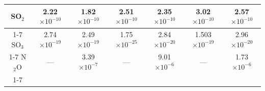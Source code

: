 \begin{table}[h]
\begin{tabular}{c|c|c|c|c|c|c}
SO$_2$ & 2.22$\times10^{-10}$ & 1.82$\times10^{-10}$ & 2.51$\times10^{-10}$ & 2.35$\times10^{-10}$ & 3.02$\times10^{-10}$ & 2.57$\times10^{-10}$ \\ \cline{1-7}
SO$_3$ & 2.74$\times10^{-19}$ & 2.49$\times10^{-19}$ & 1.75$\times10^{-25}$ & 2.84$\times10^{-20}$ & 1.503$\times10^{-19}$ & 2.96$\times10^{-20}$ \\ \cline{1-7}
N$_2$O & --- & 3.39$\times10^{-7}$ & --- & 9.01$\times10^{-6}$ & --- & 1.73$\times10^{-6}$ \\ \cline{1-7}
\end{tabular}
\label{tab:inital_produced_mix_ratios}
\end{table}


{}






